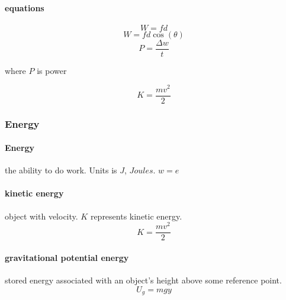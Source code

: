 \documentclass{article} %
\begin{document}
            \paragraph{equations}
                $$W=fd$$
                $$W=fd\cos(\theta)$$
                $$P=\dfrac{\Delta w}{t}$$
                \begin{center} where $P$ is power \end{center}
                $$K=\frac{mv^2}{2}$$
        \subsubsection{Energy}
            \paragraph{Energy}
                the ability to do work. Units is $J$, $Joules$. $w=e$
            \paragraph{kinetic energy}
                object with velocity. $K$ represents kinetic energy.
                $$K=\frac{mv^2}{2}$$ 
            \paragraph{gravitational potential energy}%
            \label{par:gravitational potential energy}
                stored energy associated with an object's height above some reference point.
                $$U_g=mgy$$
\end{document}
